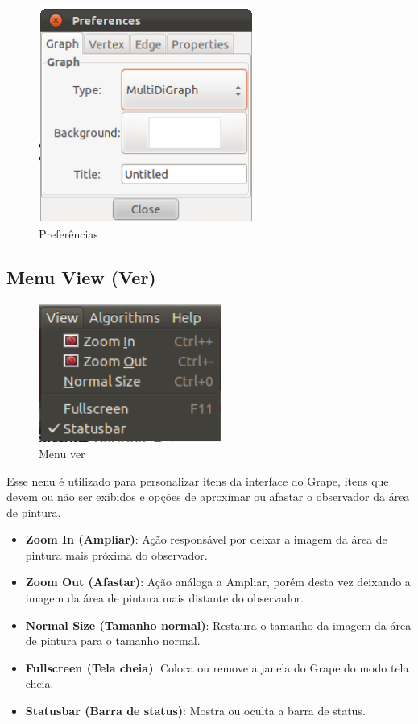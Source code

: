 \documentclass[a4paper]{abnt}
\begin{document}
\begin{figure}[H]
    \centering
	\includegraphics[width=7cm]{grape_global_preferences.png}
	\caption{Preferências}
	\label{img_global_preferences}
\end{figure}

\subsection{Menu View (Ver)}
\begin{figure}[htb]
    \centering
	\includegraphics[width=6cm]{grape_menu_view.png}
	\caption{Menu ver}
	\label{img_menu_view}
\end{figure}

Esse nenu é utilizado para personalizar itens da interface do Grape, itens que devem ou não ser exibidos e opções de aproximar ou afastar o observador da área de pintura.

\begin{itemize}
    \item \textbf{Zoom In (Ampliar)}: Ação responsável por deixar a imagem da área de pintura mais próxima do observador.
    \item \textbf{Zoom Out (Afastar)}: Ação análoga a Ampliar, porém desta vez deixando a imagem da área de pintura mais distante do observador.
    \item \textbf{Normal Size (Tamanho normal)}: Restaura o tamanho da imagem da área de pintura para o tamanho normal.
    \item \textbf{Fullscreen (Tela cheia)}: Coloca ou remove a janela do Grape do modo tela cheia.
    \item \textbf{Statusbar (Barra de status)}: Mostra ou oculta a barra de status.
\end{itemize}
\end{document}
